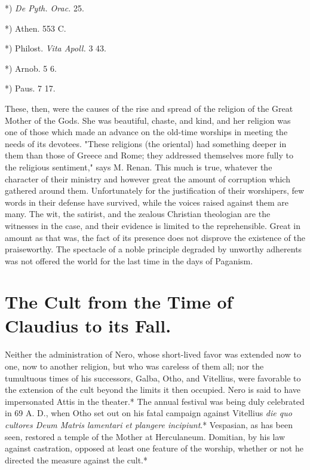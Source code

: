 \documentclass[a4paper, 11pt, oneside, polutonikogreek, english]{article}
\begin{document}
*) \emph{De Pyth. Orac.} 25.

*) Athen. 553 C.

*) Philost. \emph{Vita Apoll.} 3 43.

*) Arnob. 5 6.

*) Paus. 7 17.

These, then, were the causes of the rise and spread of the religion of the Great Mother of the Gods. She was beautiful, chaste, and kind, and her religion was one of those which made an advance on the old-time worships in meeting the needs of its devotees. "These religions (the oriental) had something deeper in them than those of Greece and Rome; they addressed themselves more fully to the religious sentiment," says M. Renan. This much is true, whatever the character of their ministry and however great the amount of corruption which gathered around them. Unfortunately for the justification of their worshipers, few words in their defense have survived, while the voices raised against them are many. The wit, the satirist, and the zealous Christian theologian are the witnesses in the case, and their evidence is limited to the reprehensible. Great in amount as that was, the fact of its presence does not disprove the existence of the praiseworthy. The spectacle of a noble principle degraded by unworthy adherents was not offered the world for the last time in the days of Paganism.

\section{The Cult from the Time of Claudius to its Fall.}
\paragraph{}
Neither the administration of Nero, whose short-lived favor was extended now to one, now to another religion, but who was careless of them all; nor the tumultuous times of his successors, Galba, Otho, and Vitellius, were favorable to the extension of the cult beyond the limits it then occupied. Nero is said to have impersonated Attis in the theater.* The annual festival was being duly celebrated in 69 A. D., when Otho set out on his fatal campaign against Vitellius \emph{die quo cultores Deum Matris lamentari et plangere incipiunt}.* Vespasian, as has been seen, restored a temple of the Mother at Herculaneum. Domitian, by his law against castration, opposed at least one feature of the worship, whether or not he directed the measure against the cult.*
\end{document}
